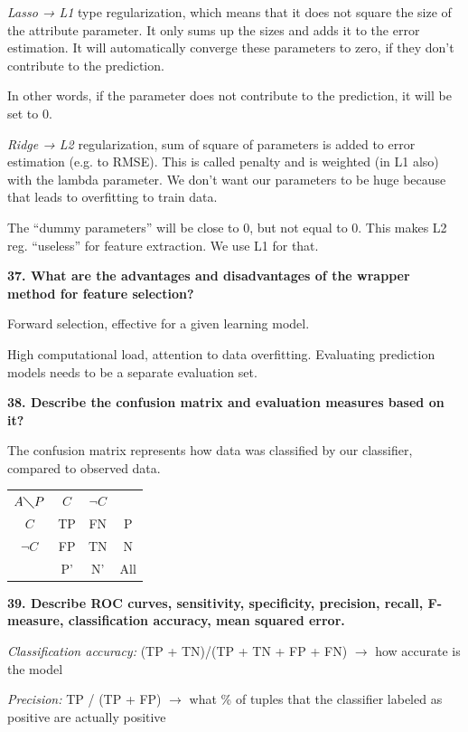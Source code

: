 \textit{Lasso → L1} type regularization, which means that it does not
square the size of the attribute parameter. It only sums up the sizes
and adds it to the error estimation. It will automatically converge
these parameters to zero, if they don't contribute to the prediction.

In other words, if the parameter does not contribute to the prediction,
it will be set to 0.

\textit{Ridge → L2} regularization, sum of square of parameters is
added to error estimation (e.g. to RMSE). This is called penalty and is
weighted (in L1 also) with the lambda parameter. We don't want our
parameters to be huge because that leads to overfitting to train data.

The ``dummy parameters'' will be close to 0, but not equal to 0. This
makes L2 reg. ``useless'' for feature extraction. We use L1 for that.

\textbf{37. What are the advantages and disadvantages of the wrapper
method for feature selection?}

Forward selection, effective for a given learning model.

High computational load, attention to data overfitting. Evaluating
prediction models needs to be a separate evaluation set.

\textbf{38. Describe the confusion matrix and evaluation measures based
on it?}

The confusion matrix represents how data was classified by our
classifier, compared to observed data.

\begin{center}
  \begin{tabular}{|c||c|c|c|}
    \hline
    $A \diagdown P$ & $C$ & $\neg C$ & \\ \hhline{|=||=|=|=|}
    $C$ & TP & FN & P \\ \hline
    $\neg C$ & FP & TN & N \\ \hline
     & P' & N' & All \\ \hline
  \end{tabular}
\end{center}


\textbf{39. Describe ROC curves, sensitivity, specificity, precision,
recall, F-measure, classification accuracy, mean squared error.}

\textit{Classification accuracy:} (TP + TN)/(TP + TN + FP + FN)
$\rightarrow$ how accurate is the model

\textit{Precision:} TP / (TP + FP) $\rightarrow$ what \% of tuples
that the classifier labeled as positive are actually positive

